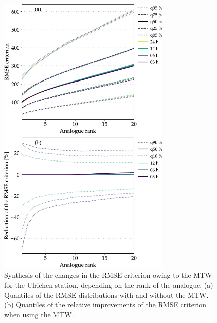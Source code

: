 \documentclass[hess, manuscript]{copernicus}
\begin{document}
	\begin{figure}[htb]
		\begin{center}
			\includegraphics[width=8.3cm]{fig08.pdf}
		\end{center}
		\caption{Synthesis of the changes in the RMSE criterion owing to the MTW for the Ulrichen station, depending on the rank of the analogue. (a) Quantiles of the RMSE distributions with and without the MTW. (b) Quantiles of the relative improvements of the RMSE criterion when using the MTW.}
		\label{fig:changes_RMSE}
	\end{figure}
\end{document}
